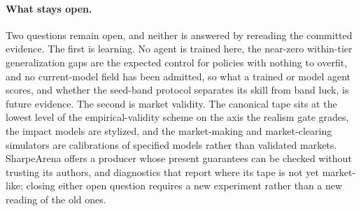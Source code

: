 \paragraph{What stays open.} Two questions remain open, and neither is answered by rereading the committed evidence. The first is learning. No agent is trained here, the near-zero within-tier generalization gaps are the expected control for policies with nothing to overfit, and no current-model field has been admitted, so what a trained or model agent scores, and whether the seed-band protocol separates its skill from band luck, is future evidence. The second is market validity. The canonical tape sits at the lowest level of the empirical-validity scheme on the axis the realism gate grades, the impact models are stylized, and the market-making and market-clearing simulators are calibrations of specified models rather than validated markets. SharpeArena offers a producer whose present guarantees can be checked without trusting its authors, and diagnostics that report where its tape is not yet market-like; closing either open question requires a new experiment rather than a new reading of the old ones.

